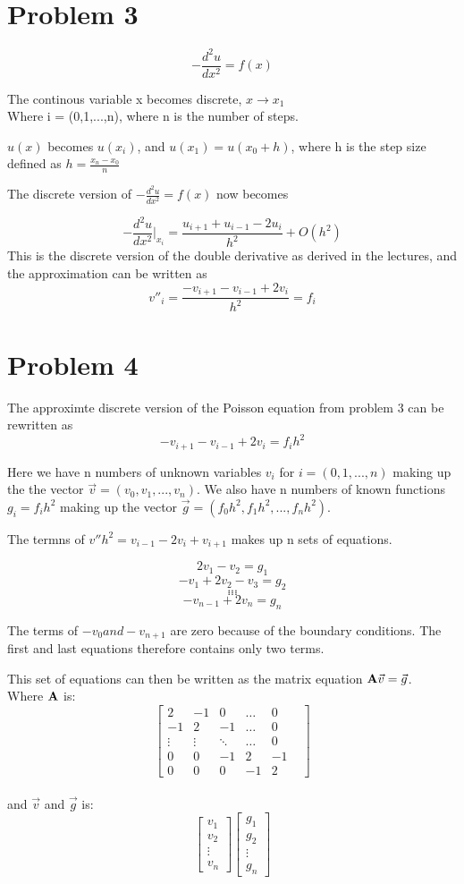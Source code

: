 \documentclass[english,notitlepage]{revtex4-1}  %
\begin{document}
\section{Problem 3}
\[-\frac{d^2u}{dx^2}=f(x)\]

The continous variable x becomes discrete, $x\rightarrow x_1$\\
Where i = (0,1,...,n), where n is the number of steps. 

$u(x)$ becomes $u(x_i)$, and $u(x_1)=u(x_0+h)$,
where h is the step size defined as $ h = \frac{x_n-x_0}{n}$

The discrete version of $-\frac{d^2u}{dx^2}= f(x)$ now becomes \

\[ -\frac{d^2u}{dx^2} \vert_{x_i}= \frac{u_{i+1} + u_{i-1} - 2u_i}{h^2} + O(h^2) \]
This is the discrete version of the double derivative as derived in the lectures,
and the approximation can be written as 
\[v''_i = \frac{-v_{i+1}-v_{i-1}+2v_i}{h^2} = f_i\]


\section{Problem 4}

The approximte discrete version of the Poisson equation from problem 3 can be rewritten as \[-v_{i+1}-v_{i-1}+2v_i = f_i h^2\]

Here we have n numbers of unknown variables $v_i$ for $i=(0,1,...,n)$ making up the the vector $\vec{v}=(v_0,v_1,...,v_n)$. We also have n numbers of known functions $g_i = f_i h^2$ making up the vector $\vec{g}=(f_0h^2,f_1h^2,...,f_nh^2)$. 

The termns of $v'' h^2 = v_{i-1}-2v_i+v_{i+1}$ makes up  n sets of equations. 

\[2v_1- v_2 = g_1\]
\[-v_1 + 2v_2 - v_3 = g_2\]
 \[ .  .  . \]
  \[.  .  . \]
  \[.  .  . \]
\[-v_{n-1} + 2v_n = g_n\]

The terms of $-v_0 and -v_{n+1}$ are zero because of the boundary conditions. The first and last equations therefore contains only two terms. 

This set of equations can then be written as the matrix equation $\vb{A}\vec{v} = \vec{g}$. \\
Where $\vb{A}$ is:
\[
\begin{bmatrix}
 2  & -1 & 0 &\dots & 0 \\
 -1 & 2  & -1 & \dots & 0 \\
 \vdots & \vdots & \ddots &\dots & 0 \\
 0 & 0 &-1 & 2 & -1 \\
 0 & 0 & 0& -1 & 2 & 
\end{bmatrix} \]\\
and $\vec{v}$ and $ \vec{g}$ is: 
\[\begin{bmatrix}
	v_1 \\ v_2 \\ \vdots \\ v_n
\end{bmatrix}\begin{bmatrix}
	g_1 \\ g_2 \\ \vdots \\ g_n
\end{bmatrix}\]
\end{document}
